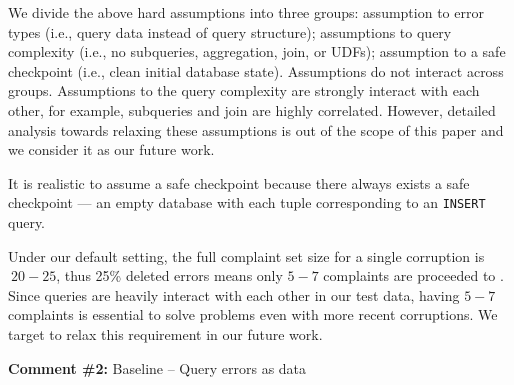 \begin{quote}
\end{quote}

We divide the above hard assumptions into three groups: assumption to error types (i.e., query data instead of query structure);
assumptions to query complexity (i.e., no subqueries, aggregation, join, or UDFs); assumption to 
a safe checkpoint (i.e., clean initial database state). Assumptions do not interact across groups. 
Assumptions to the query complexity are strongly interact with each other, for example, subqueries and join 
are highly correlated. However, detailed analysis towards relaxing these assumptions is out of the scope of this paper and 
we consider it as our future work. 


\begin{quote}
\end{quote}
It is realistic to assume a safe checkpoint because there always exists a safe checkpoint ---
an empty database with each tuple corresponding to an \texttt{INSERT} query. 

\begin{quote}
\end{quote}

Under our default setting, the full complaint set size for a single corruption is $~20-25$, thus 
25\% deleted errors means only $5-7$ complaints are proceeded to \sys. Since queries
are heavily interact with each other in our test data, having $5-7$ complaints is essential 
to solve problems even with more recent corruptions. 
We target to relax this requirement in our future work.



\comskip

\noindent
\textbf{Comment \#2:} Baseline -- Query errors as data
\begin{quote}
\end{quote}

